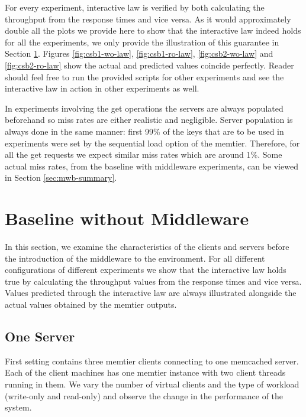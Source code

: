 \documentclass[11pt,a4paper]{article}
\begin{document}
\par For every experiment, interactive law is verified by both calculating the throughput from the response times and vice versa. As it would approximately double all the plots we provide here to show that the interactive law indeed holds for all the experiments, we only provide the illustration of this guarantee in Section \ref{sec:csb}. Figures \ref{fig:csb1-wo-law}, \ref{fig:csb1-ro-law}, \ref{fig:csb2-wo-law} and \ref{fig:csb2-ro-law} show the actual and predicted values coincide perfectly. Reader should feel free to run the provided scripts for other experiments and see the interactive law in action in other experiments as well.
\\
\par In  experiments involving the get operations the servers are always populated beforehand so miss rates are either realistic and negligible. Server population is always done in the same manner: first 99\% of the keys that are to be used in experiments were set by the sequential load option of the memtier. Therefore, for all the get requests we expect similar miss rates which are around 1\%. Some actual miss rates, from the baseline with middleware experiments, can be viewed in Section \ref{sec:mwb-summary}.


\section{Baseline without Middleware} \label{sec:csb}
In this section, we examine the characteristics of the clients and servers before the introduction of the middleware to the environment. For all different configurations of different experiments we show that the interactive law holds true by calculating the throughput values from the response times and vice versa. Values predicted through the interactive law are always illustrated alongside the actual values obtained by the memtier outputs.

\subsection{One Server} \label{sec:csb1}
First setting contains three memtier clients connecting to one memcached server. Each of the client machines has one memtier instance with two client threads running in them. We vary the number of virtual clients and the type of workload (write-only and read-only) and observe the change in the performance of the system.
\end{document}
